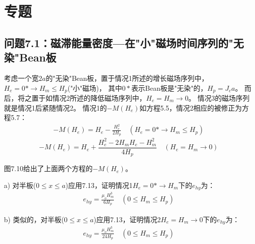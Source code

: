 \section{专题}
\subsection{问题7.1：磁滞能量密度---在"小"磁场时间序列的"无染"Bean板}
考虑一个宽$2a$的"无染"Bean板，置于情况1所述的增长磁场序列中，$H_e=0*\rightarrow H_m\le H_p$("小"磁场)，
其中$0*$表示Bean板是"无染"的，$H_p=J_c a$。
而后，将之置于如情况2所述的降低磁场序列中，$H_e=H_m\rightarrow 0$。
情况3的磁场序列就是情况1后紧随情况2。
情况1的$-M(H_e)$如方程5.5，情况2相应的被修正为方程5.7：
\begin{align*}%
-M(H_e)=H_e-\frac{H_{e}^{2}}{2H_p} \quad (H_e=0*\rightarrow H_m\leq H_p) \tag{5.5}
\end{align*}
\begin{equation}%
-M(H_e)=H_e+\frac{H_{e}^{2}-2H_mH_e-H_{m}^{2}}{4H_p}   \quad   (H_e=H_m\rightarrow 0)
\end{equation}

图7.10给出了上面两个方程的$-M(H_e)$。

a) 对半板($0\le x\le a$)应用7.13，证明情况1$H_e=0*\rightarrow H_m$下的$e_{hy}$为：
\begin{align*}%
e_{hy}=\frac{\mu_oH_{m}^{3}}{6H_p}  \quad      (0\leq H_m\leq H_p) \tag{7.13b}
\end{align*}

b) 类似的，对半板($0\le x\le a$)应用7.13，证明情况2$H_e=H_m\rightarrow 0$下的$e_{hy}$为：
\begin{align}%
e_{hy}=\frac{\mu_oH_{m}^{3}}{24H_p}  \quad     (0\leq H_m\leq H_p)
\end{align}

